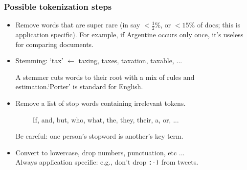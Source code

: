 \documentclass[
  shownotes,
  xcolor={svgnames},
  hyperref={colorlinks,citecolor=DarkBlue,linkcolor=DarkRed,urlcolor=DarkBlue}
  , aspectratio=169]{beamer}
\newcommand{\gr}{\color{black!60}}
\newcommand{\nv}{\color{Navy}}
\begin{document}
\begin{frame}[fragile]
\frametitle{Possible tokenization steps} 

\begin{itemize}


\item Remove words that are super rare {\gr (in say $<\frac{1}{2}$\%, or $<15\%$ of docs; this is application specific)}.
 For example, if {\nv Argentine} occurs only once, it's useless for comparing documents.


\item Stemming:  `{\nv tax}' $\leftarrow$   taxing,  taxes, taxation, taxable, ... 

{\gr A stemmer cuts words to their root with a mix of rules and estimation.`Porter' is standard for English. }



\item  Remove a list of {\nv stop words} containing  irrelevant tokens.

{\gr ~~~~~If, and, but, who, what, the, they, their, a, or, ...}

{\nv Be careful: one person's stopword is another's key term.}


\item Convert to lowercase, drop numbers, punctuation, etc ...\\
{\gr Always application specific: e.g., don't drop {\tt :-)} from tweets.}
\end{itemize}


\end{frame}
\end{document}
